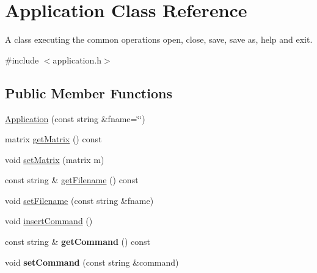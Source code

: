 \hypertarget{class_application}{}\section{Application Class Reference}
\label{class_application}


A class executing the common operations open, close, save, save as, help and exit.  




{\ttfamily \#include $<$application.\+h$>$}

\subsection*{Public Member Functions}
\begin{DoxyCompactItemize}
\item 
\hyperlink{class_application_ade4650e7378dae1d94794b86995fd571}{Application} (const string \&fname=\char`\"{}\char`\"{})
\item 
matrix \hyperlink{class_application_a67aeb617ca44a18045612d92f1d8afa0}{get\+Matrix} () const
\item 
void \hyperlink{class_application_a56b4a55e9eabd40b7f0033ba39631ebe}{set\+Matrix} (matrix m)
\item 
const string \& \hyperlink{class_application_a778575fb76de5352152d8928e1c3410f}{get\+Filename} () const
\item 
void \hyperlink{class_application_a76de879568ee39ac80484441716928d2}{set\+Filename} (const string \&fname)
\item 
void \hyperlink{class_application_a474d8507e340581404d4044c0228f655}{insert\+Command} ()
\item 
\mbox{\label{class_application_a74cdbc5e93e1f2c6bb4b45a6ad8b8a62}} 
const string \& {\bfseries get\+Command} () const
\item 
\mbox{\label{class_application_ae652f7ff140c5a74c3806f728e9a18f3}} 
void {\bfseries set\+Command} (const string \&command)
\end{DoxyCompactItemize}
